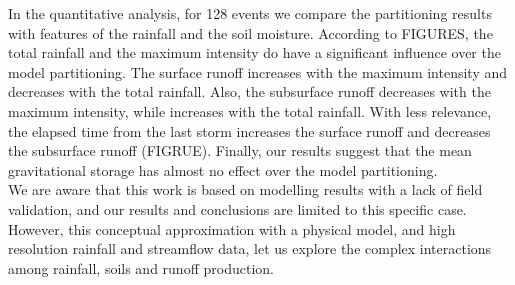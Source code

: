 \documentclass[preprint,12pt]{elsarticle}
\begin{document}
In the quantitative analysis, for 128 events we compare the partitioning results with features of the rainfall and the soil moisture.  According to FIGURES, the total rainfall and the maximum intensity do have a significant influence over the model partitioning.  The surface runoff increases with the maximum intensity and decreases with the total rainfall.  Also, the subsurface runoff decreases with the maximum intensity, while increases with the total rainfall.  With less relevance, the elapsed time from the last storm increases the surface runoff and decreases the subsurface runoff (FIGRUE). Finally, our results suggest that the mean gravitational storage has almost no effect over the model partitioning. \\

We are aware that this work is based on modelling results with a lack of field validation, and our results and conclusions are limited to this specific case. However, this conceptual approximation with a physical model, and high resolution rainfall and streamflow data, let us explore the complex interactions among rainfall, soils and runoff production.\\ 















\end{document}
